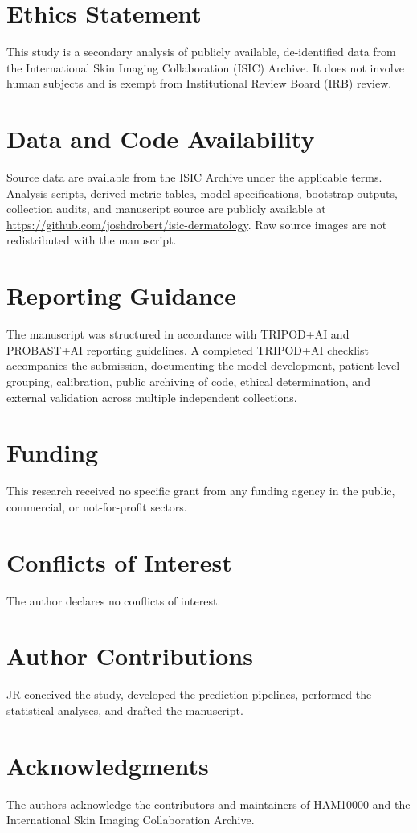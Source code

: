 \documentclass[11pt]{article}
\begin{document}
\section*{Ethics Statement}
This study is a secondary analysis of publicly available, de-identified data from the International Skin Imaging Collaboration (ISIC) Archive. It does not involve human subjects and is exempt from Institutional Review Board (IRB) review.

\section*{Data and Code Availability}
Source data are available from the ISIC Archive under the applicable terms. Analysis scripts, derived metric tables, model specifications, bootstrap outputs, collection audits, and manuscript source are publicly available at \url{https://github.com/joshdrobert/isic-dermatology}. Raw source images are not redistributed with the manuscript.

\section*{Reporting Guidance}
The manuscript was structured in accordance with TRIPOD+AI and PROBAST+AI reporting guidelines. A completed TRIPOD+AI checklist accompanies the submission, documenting the model development, patient-level grouping, calibration, public archiving of code, ethical determination, and external validation across multiple independent collections.

\section*{Funding}
This research received no specific grant from any funding agency in the public, commercial, or not-for-profit sectors.

\section*{Conflicts of Interest}
The author declares no conflicts of interest.

\section*{Author Contributions}
JR conceived the study, developed the prediction pipelines, performed the statistical analyses, and drafted the manuscript.

\section*{Acknowledgments}
The authors acknowledge the contributors and maintainers of HAM10000 and the International Skin Imaging Collaboration Archive.
\end{document}
